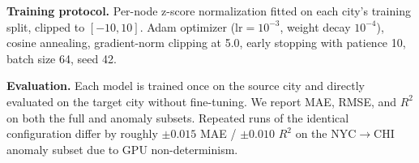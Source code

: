 \noindent\textbf{Training protocol.} Per-node z-score normalization fitted on each city's training split, clipped to $[-10,10]$. Adam optimizer ($\text{lr}=10^{-3}$, weight decay $10^{-4}$), cosine annealing, gradient-norm clipping at 5.0, early stopping with patience 10, batch size 64, seed 42.

\noindent\textbf{Evaluation.} Each model is trained once on the source city and directly evaluated on the target city without fine-tuning. We report MAE, RMSE, and $R^2$ on both the full and anomaly subsets. Repeated runs of the identical configuration differ by roughly $\pm0.015$ MAE / $\pm0.010$ $R^2$ on the NYC$\rightarrow$CHI anomaly subset due to GPU non-determinism.

